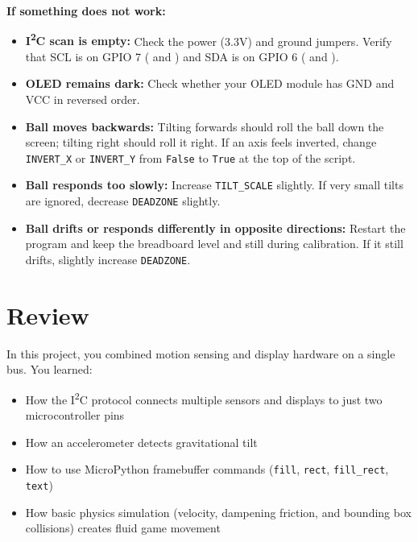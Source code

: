 \begin{tcolorbox}[colback=yellow!10!white,colframe=yellow!50!black]
    \textbf{If something does not work:}
    \begin{itemize}
        \item \textbf{I\textsuperscript{2}C scan is empty:} Check the power (3.3V) and ground jumpers. Verify that SCL is on
        GPIO 7 ( and ) and SDA is on GPIO 6
        ( and ).
        \item \textbf{OLED remains dark:} Check whether your OLED module has GND and VCC in reversed order.
        \item \textbf{Ball moves backwards:} Tilting forwards should roll the ball down the screen; tilting right should roll it right.
        If an axis feels inverted, change \texttt{INVERT\_X} or \texttt{INVERT\_Y} from \texttt{False} to \texttt{True} at the
        top of the script.
        \item \textbf{Ball responds too slowly:} Increase \texttt{TILT\_SCALE} slightly. If very small tilts are ignored,
        decrease \texttt{DEADZONE} slightly.
        \item \textbf{Ball drifts or responds differently in opposite directions:} Restart the program and keep the
        breadboard level and still during calibration. If it still drifts, slightly increase \texttt{DEADZONE}.
    \end{itemize}
\end{tcolorbox}

\section{Review}
In this project, you combined motion sensing and display hardware on a single bus. You learned:
\begin{itemize}
    \item How the I\textsuperscript{2}C protocol connects multiple sensors and displays to just two microcontroller pins
    \item How an accelerometer detects gravitational tilt
    \item How to use MicroPython framebuffer commands (\texttt{fill}, \texttt{rect}, \texttt{fill\_rect}, \texttt{text})
    \item How basic physics simulation (velocity, dampening friction, and bounding box collisions) creates fluid game movement
\end{itemize}

